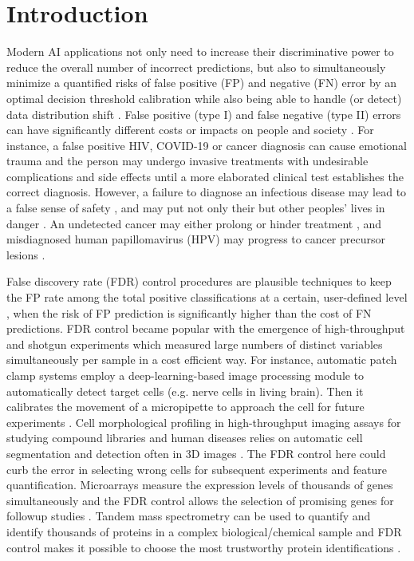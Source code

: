 \documentclass{article}
\begin{document}
\section{Introduction}

Modern AI applications not only need to increase their discriminative power to reduce the overall number of incorrect predictions, but also to simultaneously minimize a quantified risks of false positive (FP) and negative (FN) error by an optimal decision threshold calibration while also being able to handle (or detect) data distribution shift \cite{feng2022clinical, al2023artificial}. False positive (type I) and false negative (type II) errors can have significantly different costs or impacts on people and society \cite{wynants2019three}. For instance, a false positive HIV, COVID-19 or cancer diagnosis can cause emotional trauma and the person may undergo invasive treatments with undesirable complications and side effects \cite{newman2021rate, salz2010meta, Tosteson2014Consequences, xu2016frequency} until a more elaborated clinical test establishes the correct diagnosis. However, a failure to diagnose an infectious disease may lead to a false sense of safety \cite{mouliou2021false}, and may put not only their but other peoples' lives in danger \cite{woloshin2020false}. An undetected cancer may either prolong or hinder treatment \cite{bradley2021interpreting}, and misdiagnosed human papillomavirus (HPV) may progress to cancer precursor lesions \cite{macios2022false,pinsky2015principles}. 


False discovery rate (FDR) control procedures are plausible techniques to keep the FP rate among the total positive classifications at a certain, user-defined level \cite{Benjamini1995Controlling}, when the risk of FP prediction is significantly higher than the cost of FN predictions. FDR control became popular with the emergence of high-throughput and shotgun experiments which measured large numbers of distinct variables simultaneously per sample in a cost efficient way. For instance, automatic patch clamp systems employ a deep-learning-based image processing module to automatically detect target cells (e.g. nerve cells in living brain). Then it calibrates the movement of a micropipette to approach the cell for future experiments \cite{koos2021automatic}. Cell morphological profiling in high-throughput imaging assays for studying compound libraries and human diseases \cite{moshkov2024learning} relies on automatic cell segmentation and detection often in 3D images \cite{falk2019u}. The FDR control here could curb the error in selecting wrong cells for subsequent experiments and feature quantification.  Microarrays measure the expression levels of thousands of genes simultaneously and the FDR control allows the selection of promising genes for followup studies \cite{storey2002direct,storey2003statistical,barber2015controlling}. Tandem mass spectrometry can be used to quantify and identify thousands of proteins in a complex biological/chemical sample and FDR control makes it possible to choose the most trustworthy protein identifications \cite{elias2007target}.
\end{document}
